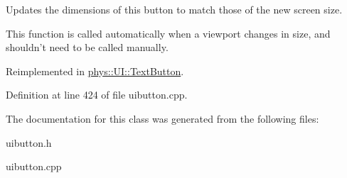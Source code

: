 Updates the dimensions of this button to match those of the new screen size. 

This function is called automatically when a viewport changes in size, and shouldn't need to be called manually. 

Reimplemented in \hyperlink{classphys_1_1UI_1_1TextButton_a5099be328baf55b9925227d11128c328}{phys::UI::TextButton}.



Definition at line 424 of file uibutton.cpp.



The documentation for this class was generated from the following files:\begin{DoxyCompactItemize}
\item 
uibutton.h\item 
uibutton.cpp\end{DoxyCompactItemize}
